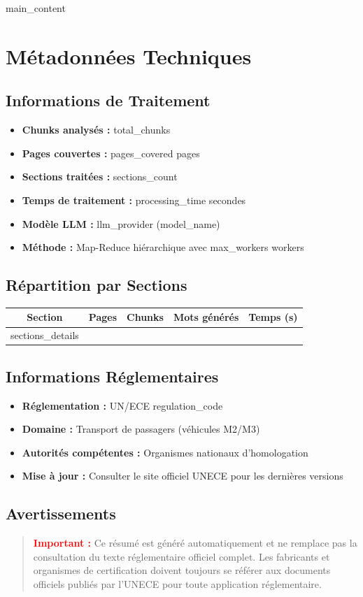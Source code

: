\documentclass[11pt,a4paper]{article}
\begin{document}
{{main_content}}

\newpage

\appendix
\section{Métadonnées Techniques}

\subsection{Informations de Traitement}
\begin{itemize}
    \item \textbf{Chunks analysés :} {{total_chunks}}
    \item \textbf{Pages couvertes :} {{pages_covered}} pages
    \item \textbf{Sections traitées :} {{sections_count}}
    \item \textbf{Temps de traitement :} {{processing_time}} secondes
    \item \textbf{Modèle LLM :} {{llm_provider}} ({{model_name}})
    \item \textbf{Méthode :} Map-Reduce hiérarchique avec {{max_workers}} workers
\end{itemize}

\subsection{Répartition par Sections}
\begin{longtable}{|c|c|c|c|c|}
\hline
\textbf{Section} & \textbf{Pages} & \textbf{Chunks} & \textbf{Mots générés} & \textbf{Temps (s)} \\
\hline
{{sections_details}}
\hline
\end{longtable}

\subsection{Informations Réglementaires}
\begin{itemize}
    \item \textbf{Réglementation :} UN/ECE {{regulation_code}}
    \item \textbf{Domaine :} Transport de passagers (véhicules M2/M3)
    \item \textbf{Autorités compétentes :} Organismes nationaux d'homologation
    \item \textbf{Mise à jour :} Consulter le site officiel UNECE pour les dernières versions
\end{itemize}

\subsection{Avertissements}
\begin{quote}
\textcolor{red}{\textbf{Important :}} Ce résumé est généré automatiquement et ne remplace pas la consultation du texte réglementaire officiel complet. Les fabricants et organismes de certification doivent toujours se référer aux documents officiels publiés par l'UNECE pour toute application réglementaire.
\end{quote}
\end{document}
